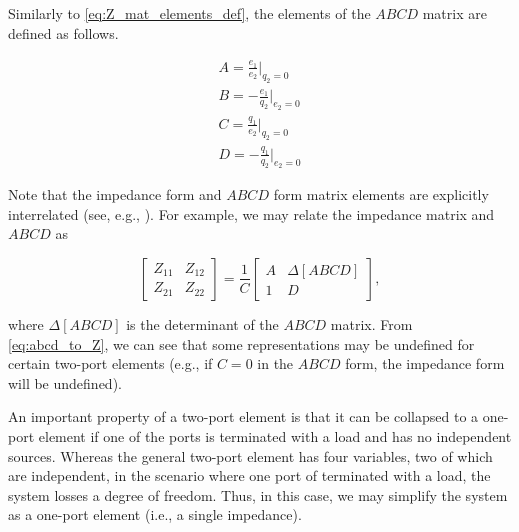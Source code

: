 \documentclass[lettersize,journal]{IEEEtran}
\begin{document}
\noindent{}Similarly to \eqref{eq:Z_mat_elements_def}, the elements of the $ABCD$ matrix are defined as follows.

\begin{subequations} \label{eq:abcd_mat_elements_def}
        \begin{align}
                A = \frac{e_1}{e_2} \bigg \vert_{q_2=0} \label{eq:abcd_mat_elements_def_a} \\[1em]
                B = - \frac{e_1}{q_2} \bigg \vert_{e_2=0} \label{eq:abcd_mat_elements_def_b} \\[1em]
                C = \frac{q_1}{e_2} \bigg \vert_{q_2=0} \label{eq:abcd_mat_elements_def_c} \\[1em]
                D = - \frac{q_1}{q_2} \bigg \vert_{e_2=0} \label{eq:abcd_mat_elements_def_d}
        \end{align}
\end{subequations}

\noindent{}Note that the impedance form and $ABCD$ form matrix elements are explicitly interrelated (see, e.g., \cite{Frickey:1994aa}).
For example, we may relate the impedance matrix and $ABCD$ as

\begin{equation}
        \begin{bmatrix}
                Z_{11} & Z_{12} \\ Z_{21} & Z_{22}
        \end{bmatrix}
        =
        \frac{1}{C}
        \begin{bmatrix}
                A & \Delta\left[ ABCD \right] \\ 1 & D
        \end{bmatrix} ,
\label{eq:abcd_to_Z}
\end{equation}

\noindent{}where $\Delta\left[ ABCD \right]$ is the determinant of the $ABCD$ matrix.
From \eqref{eq:abcd_to_Z}, we can see that some representations may be undefined for certain two-port elements (e.g., if $C=0$ in the $ABCD$ form, the impedance form will be undefined).

An important property of a two-port element is that it can be collapsed to a one-port element if one of the ports is terminated with a load and has no independent sources.
Whereas the general two-port element has four variables, two of which are independent, in the scenario where one port of terminated with a load, the system losses a degree of freedom.
Thus, in this case, we may simplify the system as a one-port element (i.e., a single impedance).
\end{document}
